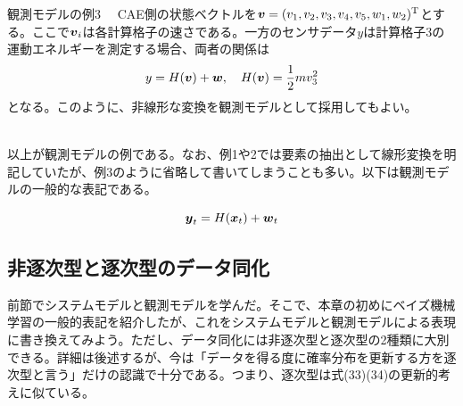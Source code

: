 \documentclass[dvipdfmx, 9pt, a4paper]{jsarticle}
\newcommand{\bm}[1]{{\mbox{\boldmath $#1$}}}
\begin{document}
\begin{itembox}[l]{観測モデルの例3}
　CAE側の状態ベクトルを$\bm v=(v_1, v_2, v_3, v_4, v_5, w_1, w_2)^{\rm T}$とする。ここで$\bm v_i$は各計算格子の速さである。一方のセンサデータ$y$は計算格子3の運動エネルギーを測定する場合、両者の関係は
\begin{equation}
y=H(\bm v)+\bm w,~~~H(\bm v)=\frac{1}{2}mv_3^2 \notag
\end{equation}
となる。このように、非線形な変換を観測モデルとして採用してもよい。
\end{itembox}\bigskip \\
以上が観測モデルの例である。なお、例1や2では要素の抽出として線形変換を明記していたが、例3のように省略して書いてしまうことも多い。以下は観測モデルの一般的な表記である。
\begin{tcolorbox}[title=データ同化の観測モデル]
\begin{equation}
\bm y_t=H(\bm x_t)+\bm w_t
\end{equation}
\end{tcolorbox}

\subsection{非逐次型と逐次型のデータ同化}
前節でシステムモデルと観測モデルを学んだ。そこで、本章の初めにベイズ機械学習の一般的表記を紹介したが、これをシステムモデルと観測モデルによる表現に書き換えてみよう。ただし、データ同化には非逐次型と逐次型の2種類に大別できる。詳細は後述するが、今は「データを得る度に確率分布を更新する方を逐次型と言う」だけの認識で十分である。つまり、逐次型は式(33)(34)の更新的考えに似ている。
\end{document}
